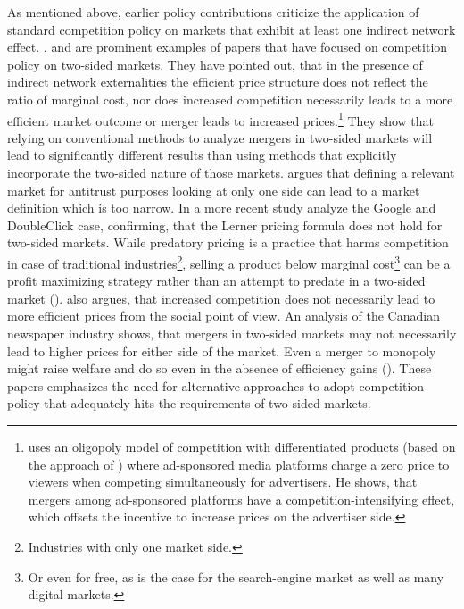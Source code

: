 \documentclass[12pt,a4paper,notitlepage]{article}
\begin{document}
As mentioned above, earlier policy contributions criticize the application of standard competition policy on markets that exhibit at least one indirect network effect. \cite{evans_antitrust_2003}, \cite{evans_industrial_2007} \cite{wright_one-sided_2004} and \cite{kaiser_price_2006} are prominent examples of papers that have focused on competition policy on two-sided markets. They have pointed out, that in the presence of indirect network externalities the efficient price structure does not reflect the ratio of marginal cost, nor does increased competition necessarily leads to a more efficient market outcome or merger leads to increased prices.\footnote{\cite{malam_mergers_2011} uses an oligopoly model of competition with differentiated products (based on the approach of \cite{salop_monopolistic_1979}) where ad-sponsored media platforms charge a zero price to viewers when competing simultaneously for advertisers. He shows, that mergers among ad-sponsored platforms have a competition-intensifying effect, which offsets the incentive to increase prices on the advertiser side.} They show that relying on conventional methods to analyze mergers in two-sided markets will lead to significantly different results than using methods that explicitly incorporate the two-sided nature of those markets. \cite{evans_antitrust_2003} argues that defining a relevant market for antitrust purposes looking at only one side can lead to a market definition which is too narrow. In a more recent study \cite{evans_analysis_2008} analyze the Google and DoubleClick case, confirming, that the Lerner pricing formula does not hold for two-sided markets. While predatory pricing is a practice that harms competition in case of traditional industries\footnote{Industries with only one market side.}, selling a product below marginal cost\footnote{Or even for free, as is the case for the search-engine market as well as many digital markets.} can be a profit maximizing strategy rather than an attempt to predate in a two-sided market (\cite{wright_one-sided_2004}). \cite{wright_one-sided_2004} also argues, that increased competition does not necessarily lead to more efficient prices from the social point of view. An analysis of the Canadian newspaper industry shows, that mergers in two-sided markets may not necessarily lead to higher prices for either side of the market. Even a merger to monopoly might raise welfare and do so even in the absence of efficiency gains (\cite{leonello_horizontal_2010}). These papers emphasizes the need for alternative approaches to adopt competition policy that adequately hits the requirements of two-sided markets. 
\end{document}
